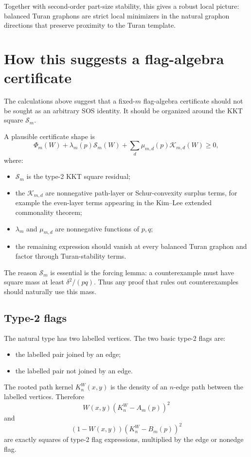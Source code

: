 \documentclass[11pt]{article}
\theoremstyle{definition}
\begin{document}
Together with second-order part-size stability, this gives a robust local picture: balanced Turan graphons are strict local minimizers in the natural graphon directions that preserve proximity to the Turan template.

\section{How this suggests a flag-algebra certificate}

The calculations above suggest that a fixed-$m$ flag-algebra certificate should not be sought as an arbitrary SOS identity.  It should be organized around the KKT square $\mathcal S_m$.

A plausible certificate shape is
\[
        \Phi_m(W)+\lambda_m(p)\mathcal S_m(W)+
        \sum_d \mu_{m,d}(p)\mathcal K_{m,d}(W)\ge0,
\]
where:
\begin{itemize}[leftmargin=2em]
        \item $\mathcal S_m$ is the type-2 KKT square residual;
        \item the $\mathcal K_{m,d}$ are nonnegative path-layer or Schur-convexity surplus terms, for example the even-layer terms appearing in the Kim--Lee extended commonality theorem;
        \item $\lambda_m$ and $\mu_{m,d}$ are nonnegative functions of $p,q$;
        \item the remaining expression should vanish at every balanced Turan graphon and factor through Turan-stability terms.
\end{itemize}

The reason $\mathcal S_m$ is essential is the forcing lemma: a counterexample must have square mass at least $\delta^2/(pq)$.  Thus any proof that rules out counterexamples should naturally use this mass.

\subsection{Type-2 flags}

The natural type has two labelled vertices.  The two basic type-2 flags are:
\begin{itemize}[leftmargin=2em]
        \item the labelled pair joined by an edge;
        \item the labelled pair not joined by an edge.
\end{itemize}
The rooted path kernel $K_n^W(x,y)$ is the density of an $n$-edge path between the labelled vertices.  Therefore
\[
        W(x,y)(K_n^W-A_m(p))^2
\]
and
\[
        (1-W(x,y))(K_n^W-B_m(p))^2
\]
are exactly squares of type-2 flag expressions, multiplied by the edge or nonedge flag.
\end{document}
